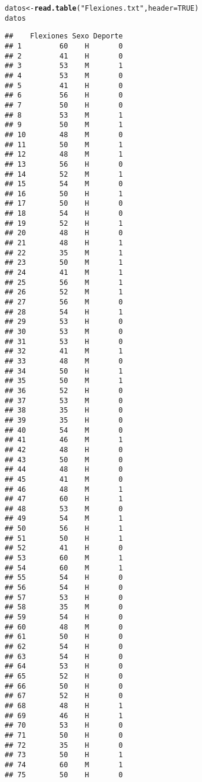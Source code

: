 \documentclass{article}\usepackage[]{graphicx}\usepackage[]{xcolor}
\makeatletter
\newcommand{\hlnum}[1]{\textcolor[rgb]{0.686,0.059,0.569}{#1}}%
\newcommand{\hlstr}[1]{\textcolor[rgb]{0.192,0.494,0.8}{#1}}%
\newcommand{\hlstd}[1]{\textcolor[rgb]{0.345,0.345,0.345}{#1}}%
\newcommand{\hlkwb}[1]{\textcolor[rgb]{0.69,0.353,0.396}{#1}}%
\newcommand{\hlkwc}[1]{\textcolor[rgb]{0.333,0.667,0.333}{#1}}%
\newcommand{\hlkwd}[1]{\textcolor[rgb]{0.737,0.353,0.396}{\textbf{#1}}}%
\newenvironment{kframe}{%
 \def\at@end@of@kframe{}%
 \ifinner\ifhmode%
  \def\at@end@of@kframe{\end{minipage}}%
  \begin{minipage}{\columnwidth}%
 \fi\fi%
 \def\FrameCommand##1{\hskip\@totalleftmargin \hskip-\fboxsep
 \colorbox{shadecolor}{##1}\hskip-\fboxsep
     \hskip-\linewidth \hskip-\@totalleftmargin \hskip\columnwidth}%
 \MakeFramed {\advance\hsize-\width
   \@totalleftmargin\z@ \linewidth\hsize
   \@setminipage}}%
 {\par\unskip\endMakeFramed%
 \at@end@of@kframe}
\newenvironment{knitrout}{}{} %
\makeatother
\begin{document}
\begin{knitrout}
\color{fgcolor}\begin{kframe}
\begin{alltt}
\hlstd{datos}\hlkwb{<-}\hlkwd{read.table}\hlstd{(}\hlstr{"Flexiones.txt"}\hlstd{,} \hlkwc{header}\hlstd{=}\hlnum{TRUE}\hlstd{)}
\hlstd{datos}
\end{alltt}
\begin{verbatim}
##    Flexiones Sexo Deporte
## 1         60    H       0
## 2         41    H       0
## 3         53    M       1
## 4         53    M       0
## 5         41    H       0
## 6         56    H       0
## 7         50    H       0
## 8         53    M       1
## 9         50    M       1
## 10        48    M       0
## 11        50    M       1
## 12        48    M       1
## 13        56    H       0
## 14        52    M       1
## 15        54    M       0
## 16        50    H       1
## 17        50    H       0
## 18        54    H       0
## 19        52    H       1
## 20        48    H       0
## 21        48    H       1
## 22        35    M       1
## 23        50    M       1
## 24        41    M       1
## 25        56    M       1
## 26        52    M       1
## 27        56    M       0
## 28        54    H       1
## 29        53    H       0
## 30        53    M       0
## 31        53    H       0
## 32        41    M       1
## 33        48    M       0
## 34        50    H       1
## 35        50    M       1
## 36        52    H       0
## 37        53    M       0
## 38        35    H       0
## 39        35    H       0
## 40        54    M       0
## 41        46    M       1
## 42        48    H       0
## 43        50    M       0
## 44        48    H       0
## 45        41    M       0
## 46        48    M       1
## 47        60    H       1
## 48        53    M       0
## 49        54    M       1
## 50        56    H       1
## 51        50    H       1
## 52        41    H       0
## 53        60    M       1
## 54        60    M       1
## 55        54    H       0
## 56        54    H       0
## 57        53    H       0
## 58        35    M       0
## 59        54    H       0
## 60        48    M       0
## 61        50    H       0
## 62        54    H       0
## 63        54    H       0
## 64        53    H       0
## 65        52    H       0
## 66        50    H       0
## 67        52    H       0
## 68        48    H       1
## 69        46    H       1
## 70        53    H       0
## 71        50    H       0
## 72        35    H       0
## 73        50    H       1
## 74        60    M       1
## 75        50    H       0
\end{verbatim}
\end{kframe}
\end{knitrout}
\end{document}
